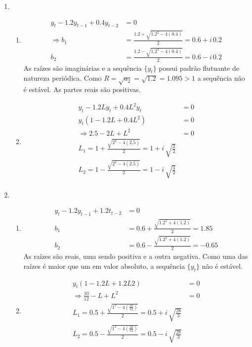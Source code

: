 \begin{enumerate}
\begin{enumerate}
\begin{enumerate}
	\end{enumerate}
		\item %
		
		\begin{enumerate}
			\item %
		
		\begin{align*}
				y_t-1.2y_{t-1}+0.4y_{t-2}&=0\\
				\Rightarrow b_1&=\frac{1.2+\sqrt{1.2^2-4(0.4)}}{2}=0.6+i\,0.2\\
				b_2&=\frac{1.2-\sqrt{1.2^2-4(0.4)}}{2}=0.6-i\,0.2
			\end{align*}
		As raízes são imaginárias e a sequência $\{y_t\}$ possui padrão flutuante de natureza periódica. Como $R=\sqrt{a_2}=\sqrt{1.2}=1.095>1$ a sequência não é estável. As partes reais são positivas.
		
		\item %
		
		\begin{align*}
			y_t-1.2Ly_t+0.4L^2y_t&=0\\
			y_t(1-1.2L+0.4L^2)&=0\\
			\Rightarrow 2.5-2L+L^2&=0\\
			L_1=1+\frac{\sqrt{2^2-4(2.5)}}{2}=1+i\,\sqrt{\frac{3}{2}}\\
			L_2=1-\frac{\sqrt{2^2-4(2.5)}}{2}=1-i\,\sqrt{\frac{3}{2}}\\
		\end{align*}
		
	\end{enumerate}
		
		\item %
		
		\begin{enumerate}
			\item %
		
		\begin{align*}
			y_t-1.2y_{t-1}+1.2t_{t-2}&=0\\
			b_1&=0.6+\frac{\sqrt{1.2^2+4(1.2)}}{2}=1.85\\
			b_2&=0.6-\frac{\sqrt{1.2^2+4(1.2)}}{2}=-0.65
			\end{align*}
		As raízes são reais, uma sendo positiva e a outra negativa. Como uma das raízes é maior que um em valor absoluto, a sequência $\{y_t\}$ não é estável.
		
		\item %
		\begin{align*}
			y_t(1-1.2L+1.2L2)&=0\\
			\Rightarrow \frac{10}{12}-L+L^2&=0\\
			L_1=0.5+\frac{\sqrt{1^2-4(\frac{10}{12})}}{2}=0.5+i\,\sqrt{\frac{28}{3}}\\
			L_2=0.5-\frac{\sqrt{1^2-4(\frac{10}{12})}}{2}=0.5-i\,\sqrt{\frac{28}{3}}
		\end{align*}
		

\end{enumerate}
\end{enumerate}
\end{enumerate}
